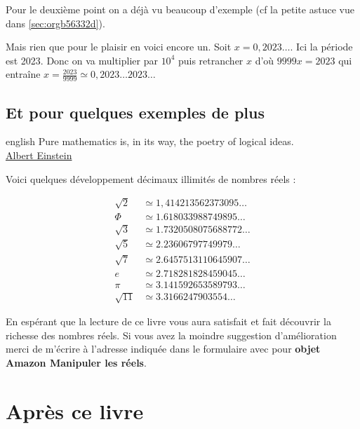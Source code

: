 \documentclass[a4paper, 11pt, twoside]{article}
\begin{document}
\startcontents[level-2]

Pour le deuxième point on a déjà vu beaucoup d'exemple (cf la petite
astuce vue dans \ref{sec:orgb56332d}).

Mais rien que pour le plaisir en voici encore un. Soit \(x =
  0,2023\dots\). Ici la période est 2023. Donc on va multiplier par
\(10^4\) puis retrancher \(x\) d'où \(9999x = 2023\) qui entraîne \(x =
  \frac{2023}{9999} \simeq 0,2023\dots 2023\dots\)
\stopcontents[level-2]

\subsection{Et pour quelques exemples de plus}
\label{sec:orgbc7e303}

\begin{foreigndisplayquote}{english}
Pure mathematics is, in its way, the poetry of logical ideas.\\
\href{https://en.wikipedia.org/wiki/Albert\_Einstein}{Albert Einstein}   
\end{foreigndisplayquote}

\startcontents[level-2]

Voici quelques développement décimaux illimités de nombres réels :

\begin{align*}
\sqrt{2} &\simeq 1,414213562373095\dots\\
\Phi &\simeq 1.618033988749895\dots\\
\sqrt{3} &\simeq 1.7320508075688772\dots\\
\sqrt{5} &\simeq 2.23606797749979\dots\\
\sqrt{7} &\simeq 2.6457513110645907\dots\\
e &\simeq 2.718281828459045\dots\\
\pi &\simeq 3.141592653589793\dots \\
\sqrt{11} &\simeq 3.3166247903554\dots
\end{align*}

En espérant que la lecture de ce livre vous aura satisfait et fait
découvrir la richesse des nombres réels. Si vous avez la moindre
suggestion d'amélioration merci de m'écrire à l'adresse
indiquée dans le formulaire avec pour \textbf{objet Amazon Manipuler les réels}.
\stopcontents[level-2]
\stopcontents[level-1]

\section{Après ce livre}
\label{sec:orge9e1851}
\end{document}
